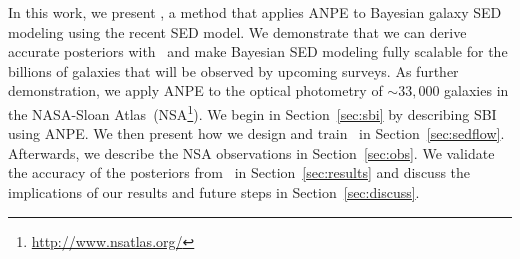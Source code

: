 
In this work, we present \sedflow, a method that applies ANPE to Bayesian
galaxy SED modeling using the recent \cite{hahn2022} SED model. 
We demonstrate that we can derive accurate posteriors with \sedflow~and make
Bayesian SED modeling fully scalable for the billions of galaxies that will be
observed by upcoming surveys.
As further demonstration, we apply ANPE to the optical photometry of
${\sim}33,000$ galaxies in the NASA-Sloan
Atlas~(NSA\footnote{\url{http://www.nsatlas.org/}}). 
We begin in Section~\ref{sec:sbi} by describing SBI using ANPE.
We then present how we design and train \sedflow~in Section~\ref{sec:sedflow}.
Afterwards, we describe the NSA observations in Section~\ref{sec:obs}. 
We validate the accuracy of the posteriors from \sedflow~in
Section~\ref{sec:results} and discuss the implications of our results and
future steps in Section~\ref{sec:discuss}. 

